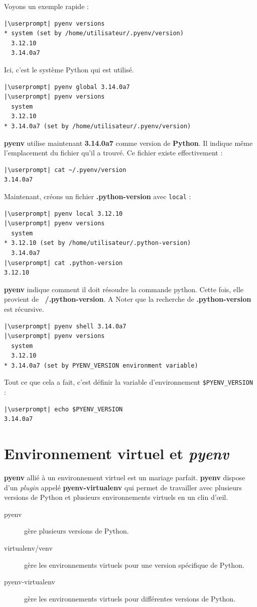 Voyons un exemple rapide :
\begin{lstlisting}[style=bash]
|\userprompt| pyenv versions
* system (set by /home/utilisateur/.pyenv/version)
  3.12.10
  3.14.0a7
\end{lstlisting}

Ici, c'est le système Python qui est utilisé.
\begin{lstlisting}[style=bash]
|\userprompt| pyenv global 3.14.0a7
|\userprompt| pyenv versions
  system
  3.12.10
* 3.14.0a7 (set by /home/utilisateur/.pyenv/version)
\end{lstlisting}

\textbf{pyenv} utilise maintenant \textbf{3.14.0a7} comme version de \textbf{Python}. Il indique même l'emplacement du fichier qu'il a trouvé. Ce fichier existe effectivement :
\begin{lstlisting}[style=bash]
|\userprompt| cat ~/.pyenv/version
3.14.0a7
\end{lstlisting}

Maintenant, créons un fichier \textbf{.python-version} avec \texttt{local} :
\begin{lstlisting}[style=bash]
|\userprompt| pyenv local 3.12.10
|\userprompt| pyenv versions
  system
* 3.12.10 (set by /home/utilisateur/.python-version)
  3.14.0a7
|\userprompt| cat .python-version
3.12.10
\end{lstlisting}

\textbf{pyenv} indique comment il doit résoudre la commande python. Cette fois, elle provient de \textbf{~/.python-version}. A Noter que la recherche de \textbf{.python-version} est récursive.
\begin{lstlisting}[style=bash]
|\userprompt| pyenv shell 3.14.0a7
|\userprompt| pyenv versions
  system
  3.12.10
* 3.14.0a7 (set by PYENV_VERSION environment variable)
\end{lstlisting}

Tout ce que cela a fait, c'est définir la variable d'environnement \texttt{\$PYENV\_VERSION} :
\begin{lstlisting}[style=bash]
|\userprompt| echo $PYENV_VERSION
3.14.0a7
\end{lstlisting}

\section{Environnement virtuel et \textit{pyenv}}
\textbf{pyenv} allié à un environnement virtuel est un mariage parfait. \textbf{pyenv} dispose d'un \textit{plugin} appelé \textbf{pyenv-virtualenv} qui permet de travailler avec plusieurs versions de Python et plusieurs environnements virtuels en un clin d'œil.
\begin{description}
    \item[pyenv] gère plusieurs versions de Python.
    \item[virtualenv/venv] gère les environnements virtuels pour une version spécifique de Python.
    \item[pyenv-virtualenv] gère les environnements virtuels pour différentes versions de Python.
\end{description}

